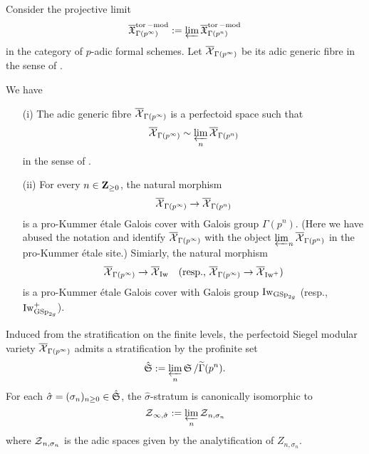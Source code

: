 Consider the projective limit
$$\overline{\operatorname{\mathfrak{X}}}_{\Gamma(p^{\infty})}^{\operatorname{tor}-\text{mod}}:=\varprojlim \overline{\operatorname{\mathfrak{X}}}_{\Gamma(p^n)}^{\operatorname{tor}-\text{mod}}$$
in the category of $p$-adic formal schemes. Let $\overline{\operatorname{\mathcal{X}}}_{\Gamma(p^{\infty})}$ be its adic generic fibre in the sense of \cite{Scholze-Weinstein}.

\begin{Proposition}\label{Proposition: perfectoid toroidal compactification}
 We have \begin{enumerate}
   \item[(i)] The adic generic fibre $\overline{\operatorname{\mathcal{X}}}_{\Gamma(p^{\infty})}$ is a perfectoid space such that  $$\overline{\operatorname{\mathcal{X}}}_{\Gamma(p^{\infty})}\sim\varprojlim_{n}\overline{\operatorname{\mathcal{X}}}_{\Gamma(p^n)}$$ in the sense of \cite[Definition 2.4.1]{Scholze-Weinstein}.
   \item[(ii)] For every $n\in \operatorname{\mathbf{Z}}_{\geq 0}$, the natural morphism
   $$\overline{\operatorname{\mathcal{X}}}_{\Gamma(p^{\infty})}\rightarrow \overline{\operatorname{\mathcal{X}}}_{\Gamma(p^n)}$$ is a pro-Kummer \'{e}tale Galois cover with Galois group $\Gamma(p^n)$. (Here we have abused the notation and identify $\overline{\operatorname{\mathcal{X}}}_{\Gamma(p^{\infty})}$ with the object $\varprojlim_{n}\overline{\operatorname{\mathcal{X}}}_{\Gamma(p^n)}$ in the pro-Kummer \'etale site.) Simiarly, the natural morphism
   $$\overline{\operatorname{\mathcal{X}}}_{\Gamma(p^{\infty})}\rightarrow \overline{\operatorname{\mathcal{X}}}_{\operatorname{Iw}} \quad (\text{resp., }\overline{\operatorname{\mathcal{X}}}_{\Gamma(p^{\infty})}\rightarrow \overline{\operatorname{\mathcal{X}}}_{\operatorname{Iw}^+})$$ is a pro-Kummer \'{e}tale Galois cover with Galois group $\operatorname{Iw}_{\operatorname{GSp}_{2g}}$ (resp., $\operatorname{Iw}_{\operatorname{GSp}_{2g}}^+$).
    \end{enumerate}
\end{Proposition}

\begin{Remark}
\normalfont Induced from the stratification on the finite levels, the perfectoid Siegel modular variety $\overline{\operatorname{\mathcal{X}}}_{\Gamma(p^{\infty})}$ admits a stratification by the profinite set
$$\hat{\operatorname{\mathfrak{S}}}:=\varprojlim_n \operatorname{\mathfrak{S}}/\widetilde{\Gamma}(p^n).$$
For each $\hat{\sigma}=(\sigma_n)_{n\geq 0}\in \hat{\operatorname{\mathfrak{S}}}$, the $\hat{\sigma}$-stratum is canonically isomorphic to 
$$\operatorname{\mathcal{Z}}_{\infty, \hat{\sigma}}:=\varprojlim_n\operatorname{\mathcal{Z}}_{n, \sigma_n}$$
where $\operatorname{\mathcal{Z}}_{n,\sigma_n}$ is the adic spaces given by the analytification of $Z_{n,\sigma_n}$.
\end{Remark}

